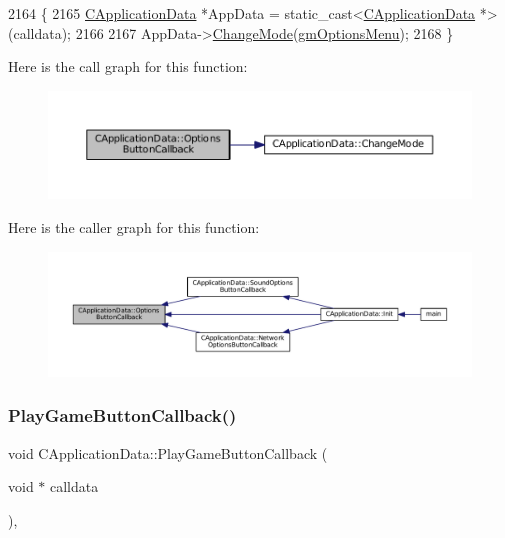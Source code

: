 \begin{DoxyCode}
2164                                                           \{
2165     \hyperlink{classCApplicationData}{CApplicationData} *AppData = \textcolor{keyword}{static\_cast<}\hyperlink{classCApplicationData}{CApplicationData} *\textcolor{keyword}{>}(calldata);
2166                   
2167     AppData->\hyperlink{classCApplicationData_aee18c113e9a0acb3cad3d63eb19de71b}{ChangeMode}(\hyperlink{classCApplicationData_ac8ac37a4c8bb871036fbbdc6a072e403a81d2e5abad73eae4325b5ee0cc69fa3e}{gmOptionsMenu});
2168 \}
\end{DoxyCode}
Here is the call graph for this function\+:
\nopagebreak
\begin{figure}[H]
\begin{center}
\leavevmode
\includegraphics[width=350pt]{classCApplicationData_a3647cf78eb59689b901d4204c81555b4_cgraph}
\end{center}
\end{figure}
Here is the caller graph for this function\+:
\nopagebreak
\begin{figure}[H]
\begin{center}
\leavevmode
\includegraphics[width=350pt]{classCApplicationData_a3647cf78eb59689b901d4204c81555b4_icgraph}
\end{center}
\end{figure}
\hypertarget{classCApplicationData_a659aa43022e92610c2f8cc182eab1b8e}{}\label{classCApplicationData_a659aa43022e92610c2f8cc182eab1b8e} 
\subsubsection{\texorpdfstring{Play\+Game\+Button\+Callback()}{PlayGameButtonCallback()}}
{\footnotesize\ttfamily void C\+Application\+Data\+::\+Play\+Game\+Button\+Callback (\begin{DoxyParamCaption}\item[{void $\ast$}]{calldata }\end{DoxyParamCaption})\hspace{0.3cm}{\ttfamily [static]}, {\ttfamily [protected]}}



